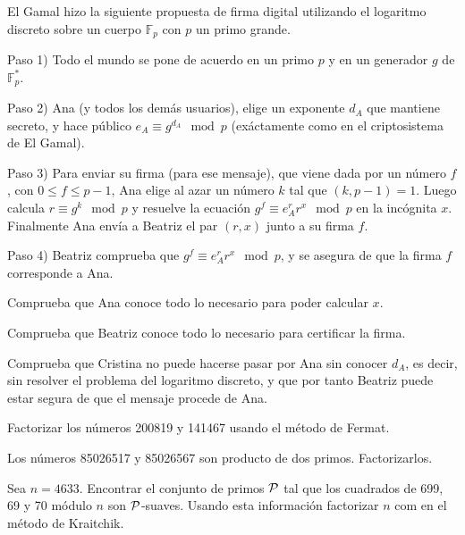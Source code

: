 \begin{problem}[3]
 El Gamal hizo la siguiente propuesta de firma digital utilizando
el logaritmo discreto sobre un cuerpo $\mathbb{F}_p$ con $p$ un primo
grande.

Paso 1) Todo el mundo se pone de acuerdo en un primo $p$ y en un
generador $g$ de $\mathbb{F}_p^*$.

Paso 2) Ana (y todos los demás usuarios), elige un exponente $d_A$
que mantiene secreto, y hace público $e_A\equiv g^{d_A}\mod p$
(exáctamente como en el criptosistema de El Gamal).

Paso 3) Para enviar su firma (para ese mensaje), que viene dada
por un número $f$, con $0\le f\le p-1$, Ana elige al azar un
número $k$ tal que $(k,p-1)=1$. Luego calcula $r\equiv g^k \mod p$
y resuelve la ecuación $g^f\equiv e_A^r r^x \mod p$ en la
incógnita $x$. Finalmente Ana envía a Beatriz el par $(r,x)$ junto
a su firma $f$.

Paso 4)  Beatriz comprueba que $g^f\equiv e_A^r r^x \mod p$, y se
asegura de que la firma $f$ corresponde a Ana.

\ppart Comprueba que Ana conoce todo lo necesario para
poder calcular $x$.

\ppart Comprueba que Beatriz conoce todo lo necesario para certificar
la firma.

\ppart Comprueba que Cristina no puede hacerse pasar por Ana sin
conocer $d_A$, es decir, sin resolver el problema del logaritmo
discreto, y que por tanto Beatriz puede estar segura de que el
mensaje procede de Ana.

\solution
\end{problem}


\begin{problem}[4]
 Factorizar los n\'umeros 200819 y 141467 usando el m\'etodo de Fermat.
\solution
\end{problem}


\begin{problem}[5]
Los números 85026517 y 85026567 son producto de dos
primos. Factorizarlos.
\solution
\end{problem}

\begin{problem}[6]
Sea $n=4633$. Encontrar el conjunto de primos $\cal P$ tal que los cuadrados de 699, 69 y 70 m\'odulo $n$ son $\cal P$-suaves. Usando esta informaci\'on factorizar $n$ com en el m\'etodo de Kraitchik.
\solution
\end{problem}

